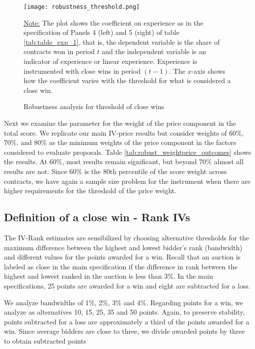  \begin{figure}[H]
         \centering
         \texttt{[image: robustness\_threshold.png]}
         \caption{Robustness analysis for threshold of close wins}
         \label{fig:close_wins_robust}

  \vskip 0.5mm
  {\justifying\footnotesize\underline{Note:} The plot shows the coefficient on experience as in the specification of Panels 4 (left) and 5 (right) of table \ref{tab:table_exp_1}, that is, the dependent variable is the share of contracts won in period $t$ and the independent variable is an indicator of experience or linear experience. Experience is instrumented with close wins in period $(t-1)$. The $x$-axis shows how the coefficient varies with the threshold for what is considered a close win.\par}
 \end{figure}

Next we examine the parameter for the weight of the price component in the total score. We replicate our main IV-price results but consider weights  of 60\%, 70\%, and 80\% as the minimum weights of the price component in the factors considered to evaluate proposals. Table \ref{tab:robust_weightprice_outcomes} shows the results. At 60\%, most results remain significant, but beyond 70\% almost all results are not. Since 60\% is the 80th percentile of the score weight across contracts, we have again a sample size problem for the instrument when there are higher requirements for the threshold of the price weight.



\subsection{Definition of a close win - Rank IVs}
The IV-Rank estimates are sensibilized by choosing alternative thresholds for the maximum difference between the highest and lowest bidder's rank (bandwidth) and different values for the points awarded for a win. Recall that an auction is labeled as close in the main specification if the difference in rank between the highest and lowest ranked in the auction is less than 3\%. In the main specifications, 25 points are awarded for a win and eight are subtracted for a loss.

We analyze bandwidths of 1\%, 2\%, 3\% and 4\%. Regarding points for a win, we analyze as alternatives 10, 15, 25, 35 and 50 points. Again, to preserve stability, points subtracted for a loss are approximately a third of the points awarded for a win. Since average bidders are close to three, we divide awarded points by three to obtain subtracted points

